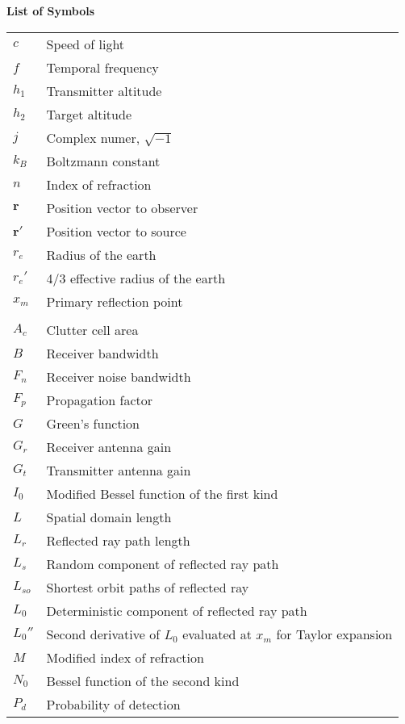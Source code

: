 \noindent\Large{\bf{List of Symbols}}

\vspace{24pt}

\small\normalsize
\begin{supertabular}{ll}
$c$ & Speed of light \\
$f$ & Temporal frequency \\
$h_1$ & Transmitter altitude\\
$h_2$ & Target altitude \\
$j$ & Complex numer, $\sqrt{-1}$ \\
$k_B$ & Boltzmann constant \\
$n$ & Index of refraction \\
$\mathbf{r}$ & Position vector to observer \\
$\mathbf{r}'$ & Position vector to source \\
$r_e$ & Radius of the earth \\
$r_e'$ & 4/3 effective radius of the earth \\
$x_m$ & Primary reflection point \\
\\
$A_c $ & Clutter cell area \\
$B$ & Receiver bandwidth \\
$F_n$ & Receiver noise bandwidth \\
$F_p$ & Propagation factor \\
$G$ & Green's function \\
$G_r$ & Receiver antenna gain \\
$G_t$ & Transmitter antenna gain \\
$I_0$ & Modified Bessel function of the first kind \\
$L$ & Spatial domain length \\
$L_r$ & Reflected ray path length \\
$L_s$ & Random component of reflected ray path \\
$L_{so}$ & Shortest orbit paths of reflected ray \\
$L_0$ & Deterministic component of reflected ray path \\
$L_0''$ & Second derivative of $L_0$ evaluated at $x_m$ for Taylor expansion\\
$M$ & Modified index of refraction \\
$N_0$ & Bessel function of the second kind \\
$P_d$ & Probability of detection \\

\end{supertabular}
